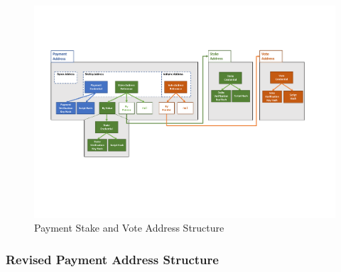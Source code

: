 \begin{figure}[h]
  \begin{center}
  \includegraphics[trim=10 150 30 80,clip,width=\textwidth]{Address-Structure}
  \end{center}
  \caption{Payment Stake and Vote Address Structure}
  \label{fig:address-structure}
\end{figure}

\subsubsection*{Revised Payment Address Structure}

